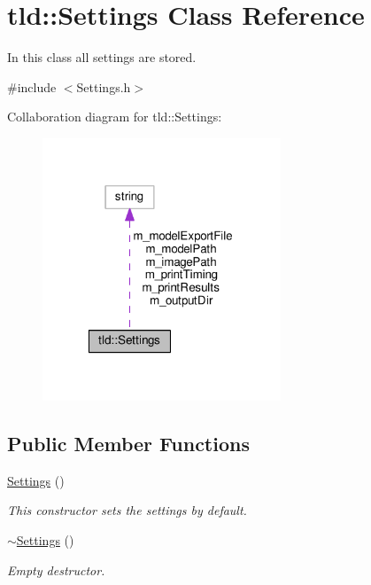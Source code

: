 \hypertarget{classtld_1_1Settings}{\section{tld\-:\-:Settings Class Reference}
\label{classtld_1_1Settings}
}


In this class all settings are stored.  




{\ttfamily \#include $<$Settings.\-h$>$}



Collaboration diagram for tld\-:\-:Settings\-:\nopagebreak
\begin{figure}[H]
\begin{center}
\leavevmode
\includegraphics[width=202pt]{classtld_1_1Settings__coll__graph}
\end{center}
\end{figure}
\subsection*{Public Member Functions}
\begin{DoxyCompactItemize}
\item 
\hyperlink{classtld_1_1Settings_a1a1d6373d0e350ef0f2697ea2a42894e}{Settings} ()
\begin{DoxyCompactList}\small\item\em This constructor sets the settings by default. \end{DoxyCompactList}\item 
\hyperlink{classtld_1_1Settings_a96eee0f4e98b706b8b5f8ec973c24dbc}{$\sim$\-Settings} ()
\begin{DoxyCompactList}\small\item\em Empty destructor. \end{DoxyCompactList}\end{DoxyCompactItemize}
